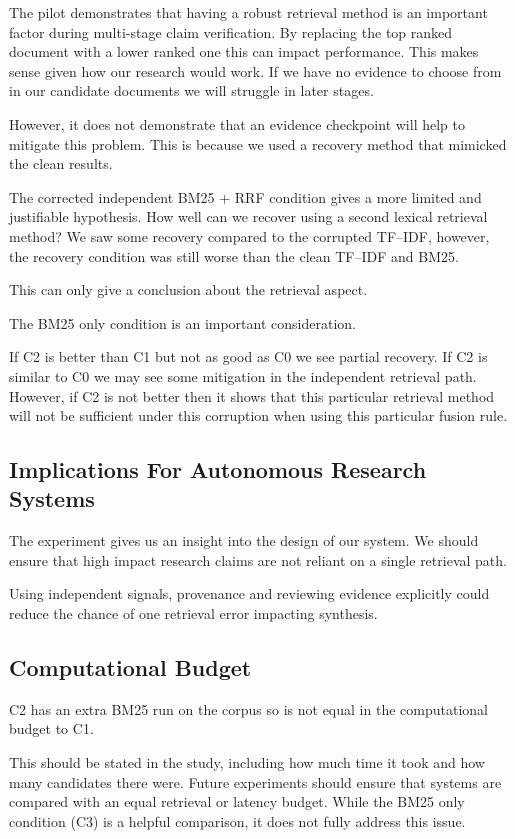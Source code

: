 \documentclass[11pt,a4paper]{article}
\begin{document}
The pilot demonstrates that having a robust retrieval method is an important factor during multi-stage claim verification. By replacing the top ranked document with a lower ranked one this can impact performance. This makes sense given how our research would work. If we have no evidence to choose from in our candidate documents we will struggle in later stages.

However, it does not demonstrate that an evidence checkpoint will help to mitigate this problem. This is because we used a recovery method that mimicked the clean results.

The corrected independent BM25 + RRF condition gives a more limited and justifiable hypothesis. How well can we recover using a second lexical retrieval method? We saw some recovery compared to the corrupted TF--IDF, however, the recovery condition was still worse than the clean TF--IDF and BM25.

This can only give a conclusion about the retrieval aspect.

The BM25 only condition is an important consideration.

If C2 is better than C1 but not as good as C0 we see partial recovery. If C2 is similar to C0 we may see some mitigation in the independent retrieval path. However, if C2 is not better then it shows that this particular retrieval method will not be sufficient under this corruption when using this particular fusion rule.

\subsection{Implications For Autonomous Research Systems}

The experiment gives us an insight into the design of our system. We should ensure that high impact research claims are not reliant on a single retrieval path.

Using independent signals, provenance and reviewing evidence explicitly could reduce the chance of one retrieval error impacting synthesis.

\subsection{Computational Budget}

C2 has an extra BM25 run on the corpus so is not equal in the computational budget to C1.

This should be stated in the study, including how much time it took and how many candidates there were. Future experiments should ensure that systems are compared with an equal retrieval or latency budget. While the BM25 only condition (C3) is a helpful comparison, it does not fully address this issue.
\end{document}
